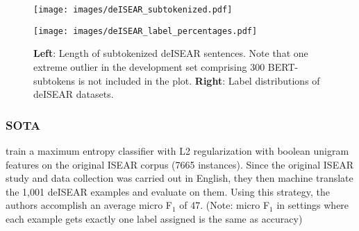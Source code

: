 



\begin{figure}
  \label{fig:deisear-stats}
  \begin{minipage}{0.45\linewidth}
  \vspace{0pt}
    \texttt{[image: images/deISEAR\_subtokenized.pdf]}
  \end{minipage}
  \hfill
  \begin{minipage}{0.45\linewidth}
  \vspace{0pt}
    \texttt{[image: images/deISEAR\_label\_percentages.pdf]}
  \end{minipage}
  \caption[XNLI Lengths]{\textbf{Left}: Length of subtokenized deISEAR sentences. Note that one extreme outlier in the
                          development set comprising 300 BERT-subtokens is not included in the plot. \textbf{Right}: Label distributions of deISEAR datasets.}
\end{figure}


\subsubsection{SOTA}

\cite{troiano2019crowdsourcing} train a maximum entropy classifier with L2 regularization with
boolean unigram features on the original ISEAR corpus (7665 instances).
Since the original ISEAR study and data collection was carried out in English, they then machine
translate the 1,001 deISEAR examples and evaluate on them.
Using this strategy, the authors accomplish an average micro F$_1$ of 47. (Note: micro F$_1$ in settings where each example gets
exactly one label assigned is the same as accuracy)

